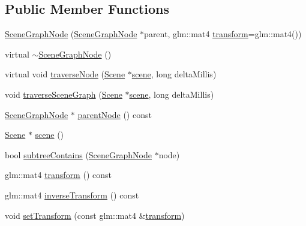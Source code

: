 \subsection*{Public Member Functions}
\begin{DoxyCompactItemize}
\item 
\hyperlink{classmotorcar_1_1SceneGraphNode_a293d96c3691afbaaba0da114a5e8f433}{Scene\-Graph\-Node} (\hyperlink{classmotorcar_1_1SceneGraphNode}{Scene\-Graph\-Node} $\ast$parent, glm\-::mat4 \hyperlink{classmotorcar_1_1SceneGraphNode_ad96e79fdd739ac8223a3128003be391a}{transform}=glm\-::mat4())
\item 
virtual \hyperlink{classmotorcar_1_1SceneGraphNode_ae81a28adc17e6be945c8279e4af4108c}{$\sim$\-Scene\-Graph\-Node} ()
\item 
virtual void \hyperlink{classmotorcar_1_1SceneGraphNode_aa680a8e89fc8ebd12b784653fb30c29a}{traverse\-Node} (\hyperlink{classmotorcar_1_1Scene}{Scene} $\ast$\hyperlink{classmotorcar_1_1SceneGraphNode_aa14e637ed4ae98f77e28941a4b5cfdd8}{scene}, long delta\-Millis)
\item 
void \hyperlink{classmotorcar_1_1SceneGraphNode_ac1e4d2185a8df5b84af1693a5d72d4fc}{traverse\-Scene\-Graph} (\hyperlink{classmotorcar_1_1Scene}{Scene} $\ast$\hyperlink{classmotorcar_1_1SceneGraphNode_aa14e637ed4ae98f77e28941a4b5cfdd8}{scene}, long delta\-Millis)
\item 
\hyperlink{classmotorcar_1_1SceneGraphNode}{Scene\-Graph\-Node} $\ast$ \hyperlink{classmotorcar_1_1SceneGraphNode_a57dd5826ed6bf15c8a879f5a090c6000}{parent\-Node} () const 
\item 
\hyperlink{classmotorcar_1_1Scene}{Scene} $\ast$ \hyperlink{classmotorcar_1_1SceneGraphNode_aa14e637ed4ae98f77e28941a4b5cfdd8}{scene} ()
\item 
bool \hyperlink{classmotorcar_1_1SceneGraphNode_ac2be631270bc40cb1e070983c30a323f}{subtree\-Contains} (\hyperlink{classmotorcar_1_1SceneGraphNode}{Scene\-Graph\-Node} $\ast$node)
\item 
glm\-::mat4 \hyperlink{classmotorcar_1_1SceneGraphNode_ad96e79fdd739ac8223a3128003be391a}{transform} () const 
\item 
glm\-::mat4 \hyperlink{classmotorcar_1_1SceneGraphNode_af8b8174098f1de1067541f0e3ebec72e}{inverse\-Transform} () const 
\item 
void \hyperlink{classmotorcar_1_1SceneGraphNode_a7cd7700336833efa89c8004e85a1fd61}{set\-Transform} (const glm\-::mat4 \&\hyperlink{classmotorcar_1_1SceneGraphNode_ad96e79fdd739ac8223a3128003be391a}{transform})
\item 

\end{DoxyCompactItemize}
